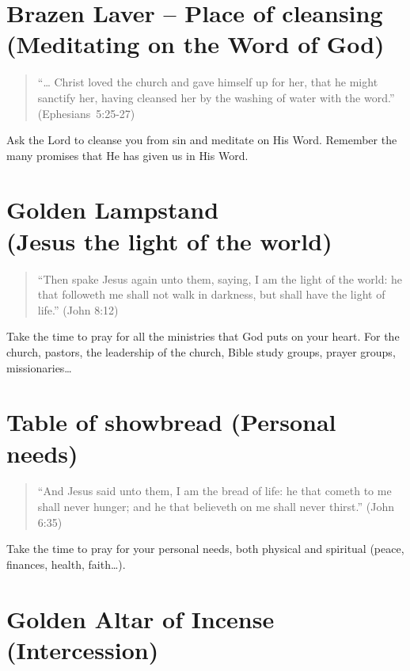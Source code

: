 \section{Brazen Laver – Place of cleansing (Meditating on the Word of God)}


\begin{quote}
``\ldots{} Christ loved the church and gave himself up for her,
    that he might sanctify her, having cleansed her by the washing
    of water with the word.''  (Ephesians~5:25-27)
\end{quote}

Ask the Lord to cleanse you from sin and meditate on His Word.
Remember the many promises that He has given us in His Word.



\section{Golden Lampstand\\(Jesus the light of the world)}


\begin{quote}
``Then spake Jesus again unto them, saying, I am the light of the world:
    he that followeth me shall not walk in darkness,
    but shall have the light of life.'' (John 8:12)
\end{quote}

Take the time to pray for all the ministries that God puts on your heart.
For the church, pastors, the leadership of the church, Bible study groups,
prayer groups, missionaries\ldots{}


\section{Table of showbread (Personal needs)}

\begin{quote}
``And Jesus said unto them, I am the bread of life:
    he that cometh to me shall never hunger;
    and he that believeth on me shall never thirst.'' (John 6:35)
\end{quote}

Take the time to pray for your personal needs,
both physical and spiritual (peace, finances, health, faith\ldots{}).


\section{Golden Altar of Incense\\(Intercession)}

